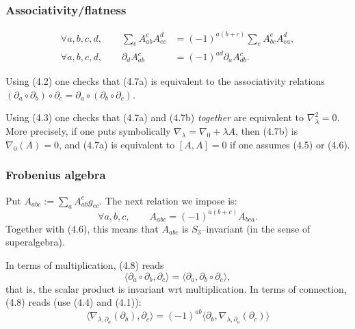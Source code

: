 \documentclass[reqno]{amsart}
\theoremstyle{definition}
\begin{document}
\medskip

\subsubsection{Associativity/flatness}
\begin{align*}
  \forall a,b,c,d, \qquad \sum_eA_{ab}^eA_{ec}^d
  &= (-1)^{a(b+c)}\sum_eA_{bc}^eA_{ea}^d,
  \tag{4.7a}
  \\
  \forall a,b,c,d,\qquad \partial_dA_{ab}^c
  &= (-1)^{ad}\partial_aA_{db}^c.
  \tag{4.7b}
\end{align*}

Using (4.2) one checks that (4.7a) is equivalent to the associativity
relations $(\partial_a\circ\partial_b)\circ\partial_c=
\partial_a\circ (\partial_b\circ\partial_c)$.

\smallskip

Using (4.3) one checks that (4.7a) and (4.7b) {\it together}
are equivalent to $\nabla_{\lambda}^2=0$. More precisely,
if one puts symbolically $\nabla_{\lambda}=\nabla_0+\lambda A$,
then (4.7b) is $\nabla_0(A)=0$, and (4.7a) is equivalent
to $[A,A]=0$ if one assumes (4.5) or (4.6).

\medskip

\subsubsection{Frobenius algebra}
Put $A_{abc}:=\sum_a A_{ab}^eg_{ec}$.
The next relation we impose is:
\begin{equation*}
  \forall a,b,c,\qquad A_{abc}=(-1)^{a(b+c)}A_{bca}.
  \tag{4.8}
\end{equation*}
Together with (4.6), this means that $A_{abc}$ is $S_3$--invariant
(in the sense of superalgebra).

\smallskip

In terms of multiplication, (4.8) reads
\begin{equation*}
  \langle \partial_a\circ\partial_b,\partial_c\rangle =
  \langle \partial_a,\partial_b\circ\partial_c\rangle ,
  \tag{4.9}
\end{equation*}
that is, the scalar product is invariant wrt multiplication.
In terms of connection, (4.8) reads (use (4.4) and (4.1)):
\begin{equation*}
  \langle \nabla_{\lambda ,\partial_a}(\partial_b),\partial_c\rangle =
  (-1)^{ab}\langle \partial_b,\nabla_{\lambda ,\partial_a}(\partial_c)\rangle
  \tag{4.9}
\end{equation*}
\end{document}
